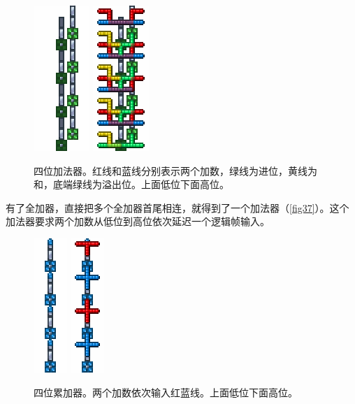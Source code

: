 \begin{figure}[!ht]
\centering
\includegraphics{images/408.png}
\qquad
\includegraphics{images/409.png}
\caption{四位加法器。红线和蓝线分别表示两个加数，绿线为进位，黄线为和，底端绿线为溢出位。上面低位下面高位。}\label{fig37}
\end{figure}

有了全加器，直接把多个全加器首尾相连，就得到了一个加法器（\autoref{fig37}）。这个加法器要求两个加数从低位到高位依次延迟一个逻辑帧输入。

\begin{figure}[!ht]
\centering
\includegraphics{images/410.png}
\qquad
\includegraphics{images/411.png}
\caption{四位累加器。两个加数依次输入红蓝线。上面低位下面高位。}\label{fig38}
\end{figure}

